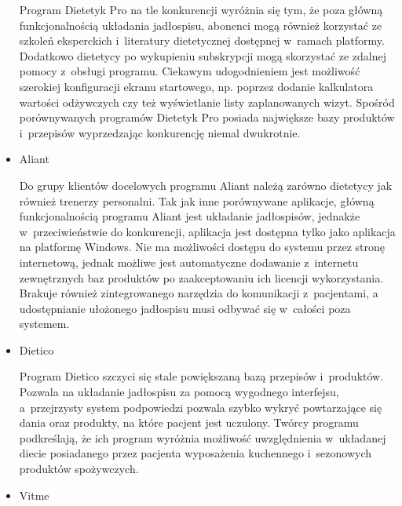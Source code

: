 \begin{itemize}
        Program Dietetyk Pro\cite{url:dietetyk-pro} na tle konkurencji wyróżnia się tym, że poza główną funkcjonalnością układania jadłospisu,
        abonenci mogą również korzystać ze szkoleń eksperckich i~literatury dietetycznej dostępnej w~ramach platformy.
        Dodatkowo dietetycy po wykupieniu subskrypcji mogą skorzystać ze zdalnej pomocy z~obsługi programu.
        Ciekawym udogodnieniem jest możliwość szerokiej konfiguracji ekranu startowego, np. poprzez dodanie kalkulatora wartości odżywczych czy też wyświetlanie listy zaplanowanych wizyt.
        Spośród porównywanych programów Dietetyk Pro posiada największe bazy produktów i~przepisów wyprzedzając konkurencję niemal dwukrotnie.
%
    \item Aliant

        Do grupy klientów docelowych programu Aliant\cite{url:aliant} należą zarówno dietetycy jak również trenerzy personalni.
        Tak jak inne porównywane aplikacje, główną funkcjonalnością programu Aliant jest układanie jadłospisów,
        jednakże w~przeciwieństwie do konkurencji, aplikacja jest dostępna tylko jako aplikacja na platformę Windows.
        Nie ma możliwości dostępu do systemu przez stronę internetową, jednak możliwe jest automatyczne dodawanie z~internetu zewnętrznych baz produktów po zaakceptowaniu ich licencji wykorzystania.
        Brakuje również zintegrowanego narzędzia do komunikacji z~pacjentami, a udostępnianie ułożonego jadłospisu musi odbywać się w~całości poza systemem.
%
    \item Dietico

        Program Dietico\cite{url:dietico} szczyci się stale powiększaną bazą przepisów i~produktów.
        Pozwala na układanie jadłospisu za pomocą wygodnego interfejsu,
        a~przejrzysty system podpowiedzi pozwala szybko wykryć powtarzające się dania oraz produkty, na które pacjent jest uczulony.
        Twórcy programu podkreślają, że ich program wyróżnia możliwość uwzględnienia w~układanej diecie posiadanego przez pacjenta wyposażenia kuchennego i~sezonowych produktów spożywczych.
%
    \item Vitme


\end{itemize}
